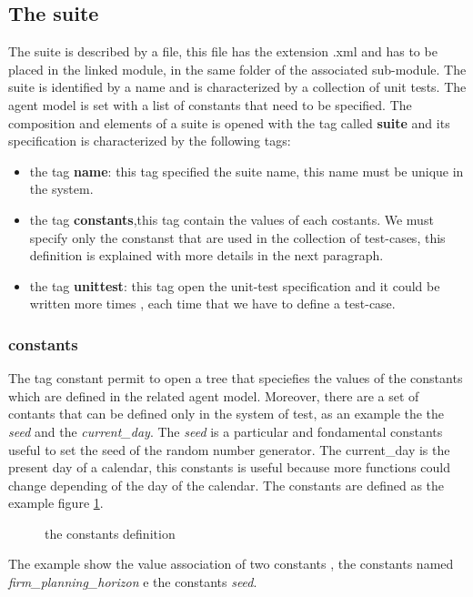 \documentclass[a4paper,10pt]{article}
\begin{document}
\subsection{The suite}
The suite is described by a file, this file has the extension .xml and  has to be placed in the linked module, in the same folder of the associated sub-module. The suite is identified by a name and is characterized by a collection of unit tests. The agent model is set with a list of constants that need to be specified.
The composition and elements of a suite is opened with the tag called \textbf{suite} and its specification is characterized by the following tags:

\begin{itemize}
\item the tag \textbf{name}: this tag specified the suite name, this name must be unique in the system.
\item the tag \textbf{constants},this tag contain the values of each costants. We must specify only the constanst that are used in the collection of test-cases, this definition is explained with more details in the next paragraph.
\item the tag \textbf{unittest}: this tag open the unit-test specification and it could be written more times , each time that we have to define a test-case.
\end{itemize}
\subsubsection{constants}
The tag constant permit to open a tree that speciefies the  values of the constants which are defined in the related agent model. Moreover, there are a set of contants that can be defined only in the system of test, as an example the the \textit{seed} and the \textit{current\_day}. The \textit{seed} is a particular and fondamental constants useful to set the seed of the random number generator. The current\_day is the present day of a calendar, this constants is useful because more functions could change depending of the day of the calendar.
The constants are defined as the example figure \ref{fig:fig3}.
\begin{figure}
\label{fig:fig3}

\caption{the constants definition }
\end{figure}
The example show the value association of two constants , the constants named \textit{firm\_planning\_horizon } e the constants \textit{seed}. 
\end{document}
